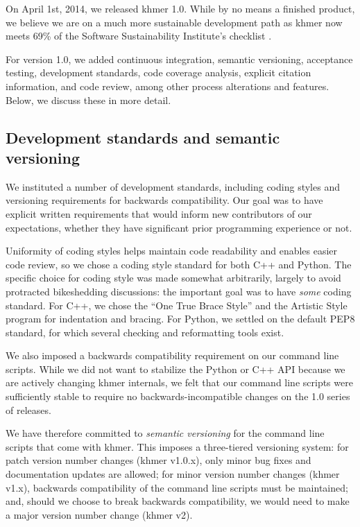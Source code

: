 \documentclass[12pt]{article}
\begin{document}
On April 1st, 2014, we released khmer 1.0.  While by no means a finished
product, we believe we are on a much more sustainable development path as khmer
now meets 69\% of the Software Sustainability Institute's checklist
\cite{khmer-1.0-assessment}.

For version 1.0, we added continuous integration, semantic versioning,
acceptance testing, development standards, code coverage analysis,
explicit citation information, and code review, among other process
alterations and features.  Below, we discuss these in more detail.

\subsection{Development standards and semantic versioning}

We instituted a number of development standards, including coding
styles and versioning requirements for backwards compatibility.  Our
goal was to have explicit written requirements that would inform new
contributors of our expectations, whether they have significant prior
programming experience or not.

Uniformity of coding styles helps maintain code readability and
enables easier code review, so we chose a coding style standard for
both C++ and Python. The specific choice for coding style was made
somewhat arbitrarily, largely to avoid protracted bikeshedding
discussions: the important goal was to have {\em some} coding standard. For
C++, we chose the ``One True Brace Style'' and the Artistic
Style program for indentation and bracing.  For Python, we settled on the default
PEP8 standard, for which several checking and reformatting tools
exist.

We also imposed a backwards compatibility requirement on our command
line scripts.  While we did not want to stabilize the Python or C++
API because we are actively changing khmer internals, we felt that
our command line scripts were sufficiently stable to require no
backwards-incompatible changes on the 1.0 series of releases.

We have therefore committed to {\em semantic versioning}\cite{semver} for the
command line scripts that come with khmer.  This imposes a
three-tiered versioning system: for patch version number changes
(khmer v1.0.x), only minor bug fixes and documentation updates are
allowed; for minor version number changes (khmer v1.x), backwards
compatibility of the command line scripts must be maintained; and,
should we choose to break backwards compatibility, we would need to
make a major version number change (khmer v2).
\end{document}
